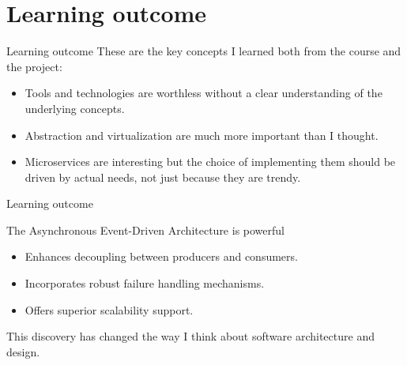 \documentclass{beamer}
\begin{document}
\section{Learning outcome}
\begin{frame}{Learning outcome}
	These are the key concepts I learned both from the course and the project:
	\begin{itemize}
		\item Tools and technologies are worthless without a clear understanding of the underlying concepts.
		\item Abstraction and virtualization are much more important than I thought. %
		\item Microservices are interesting but the choice of implementing them should be driven by actual needs, not just because they are trendy.
	\end{itemize}
\end{frame}

\begin{frame}{Learning outcome}
	\begin{block}{The Asynchronous Event-Driven Architecture is powerful}
	\begin{itemize}
		\item Enhances decoupling between producers and consumers. 
		\item Incorporates robust failure handling mechanisms.
		\item Offers superior scalability support.
	\end{itemize}
	\end{block}

	This discovery has changed the way I think about software architecture and design.
\end{frame}
\end{document}
